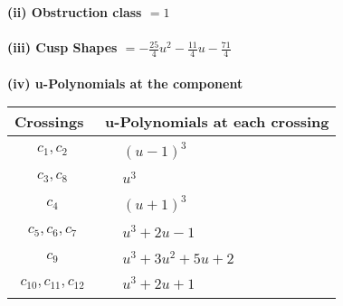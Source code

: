 \documentclass[1p]{elsarticle_modified}
\theoremstyle{definition}
\begin{document}
\flushleft \textbf{(ii) Obstruction class $= 1$}\\~\\
\flushleft \textbf{(iii) Cusp Shapes $= -\frac{25}{4} u^2-\frac{11}{4} u-\frac{71}{4}$}\\~\\
\newpage\renewcommand{\arraystretch}{1}
\flushleft \textbf{(iv) u-Polynomials at the component}\newline \\
\begin{tabular}{m{50pt}|m{274pt}}
Crossings & \hspace{64pt}u-Polynomials at each crossing \\
\hline $$\begin{aligned}c_{1},c_{2}\end{aligned}$$&$\begin{aligned}
&(u-1)^3
\end{aligned}$\\
\hline $$\begin{aligned}c_{3},c_{8}\end{aligned}$$&$\begin{aligned}
&u^3
\end{aligned}$\\
\hline $$\begin{aligned}c_{4}\end{aligned}$$&$\begin{aligned}
&(u+1)^3
\end{aligned}$\\
\hline $$\begin{aligned}c_{5},c_{6},c_{7}\end{aligned}$$&$\begin{aligned}
&u^3+2 u-1
\end{aligned}$\\
\hline $$\begin{aligned}c_{9}\end{aligned}$$&$\begin{aligned}
&u^3+3 u^2+5 u+2
\end{aligned}$\\
\hline $$\begin{aligned}c_{10},c_{11},c_{12}\end{aligned}$$&$\begin{aligned}
&u^3+2 u+1
\end{aligned}$\\
\hline
\end{tabular}\\~\\
\end{document}
